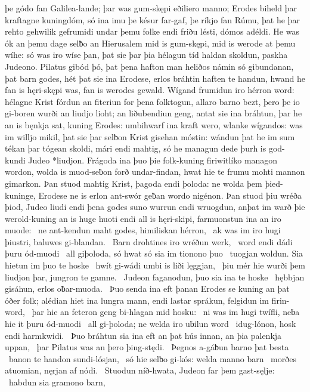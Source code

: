 þe gódo fan Galilea-lande; þar was gum-skępi
eðiliero manno; Erodes biheld þar
kraftagne kuningdóm, só ina imu þe késur far-gaf,
þe ríkjo fan Rúmu, þat he þar rehto gehwilik
gefrumidi undar þemu folke endi friðu lésti,
dómos adéldi. He was ók an þemu dage selƀo
an Hierusalem mid is gum-skępi,
mid is werode at þemu wíhe: só was iro wíse þan,
þat sie þar þia hélagun tíd haldan skoldun,
paskha Judeono. Pilatus gibód þó,
þat þena hafton man heliðos námin
só gibundanan, þat barn godes,
hét þat sie ina Erodese, erlos bráhtin
haften te handun, hwand he fan is hęri-skępi was,
fan is werodes gewald. Wígand frumidun
iro hérron word: hélagne Krist
fórdun an fiteriun for þena folktogun,
allaro barno bezt, þero þe io gi-boren wurði
an liudjo lioht; an liðubendiun geng,
antat sie ina bráhtun, þar he an is bęnkja sat,
kuning Erodes: umbihwarf ina kraft wero,
wlanke wígandos: was im willjo mikil,
þat sie þar selƀon Krist gisehan móstin:
wándun þat he im sum tékan þar tógean skoldi,
mári endi mahtig, só he managun dede
þurh is god-kundi Judeo *liudjon.
Frágoda ina þuo þie folk-kuning firiwitlíko
managon wordon, wolda is muod-seƀon
forð undar-findan, hwat hie te frumu mohti
mannon gimarkon. Þan stuod mahtig Krist,
þagoda endi þoloda: ne wolda þem þied-kuninge,
Erodese ne is erlon ant-swór geƀan
wordo nigénon. Þan stuod þiu wréða þiod,
Judeo liudi endi þena godes suno
wurrun endi wruogdun, anþat im warð þie werold-kuning
an is huge huoti endi all is hęri-skipi,
farmuonstun ina an iro muode: \hld\ ne ant-kendun maht godes,
himiliskan hérron, \hld\ ak was im iro hugi þiustri,
baluwes gi-blandan. \hld\ Barn drohtines
iro wréðun werk, \hld\ word endi dádi
þuru ód-muodi \hld\ all giþoloda,
só hwat só sia im tionono þuo \hld\ tuogjan woldun.
Sia hietun im þuo te hoske \hld\ hwít gi-wádi
umbi is liði lęggjan, \hld\ þiu mér hie wurði þem liudjon þar,
jungron te gamne. \hld\ Judeon faganodun,
þuo sia ina te hoske \hld\ hębbjan gisáhun,
erlos oƀar-muoda. \hld\ Þuo senda ina eft þanan
Erodes se kuning an þat óðer folk;
alédian hiet ina lungra mann, endi lastar sprákun,
felgidun im firin-word, \hld\ þar hie an feteron geng
bi-hlagan mid hosku: \hld\ ni was im hugi twífli,
neƀa hie it þuru ód-muodi \hld\ all gi-þoloda;
ne welda iro uƀilun word \hld\ idug-lónon,
hosk endi harmkwidi. \hld\ Þuo bráhtun sia ina eft an þat hús innan,
an þia palenkja uppan, \hld\ þar Pilatus was
an þero þing-stędi. \hld\ Þegnos a-gáƀun
barno þat besta \hld\ banon te handon
sundi-lósjan, \hld\ só hie selƀo gi-kós:
welda manno barn \hld\ morðes atuomian,
nęrjan af nódi. \hld\ Stuodun níð-hwata,
Judeon far þem gast-sęlje: \hld\ habdun sia gramono barn,
